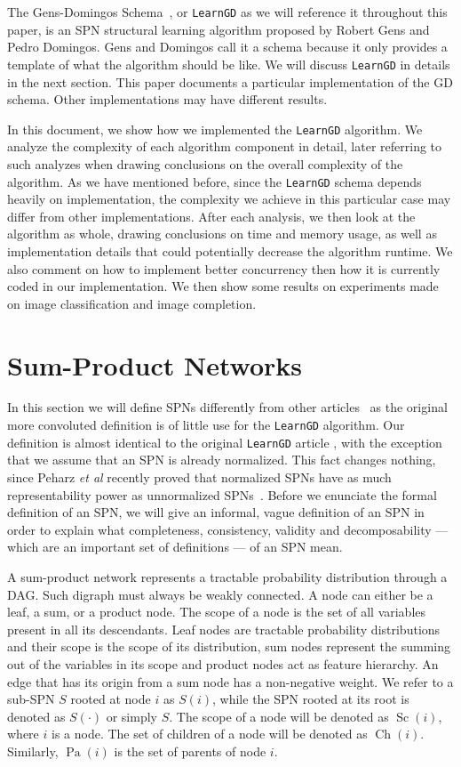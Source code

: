 \documentclass{amsart}
\DeclareMathOperator*{\Ch}{\text{Ch}}
\DeclareMathOperator*{\Pa}{\text{Pa}}
\DeclareMathOperator*{\Sc}{\text{Sc}}
\theoremstyle{plain}
\numberwithin{equation}{section}
\newcommand{\code}[1]{\lstinline[mathescape=true]{#1}}
\begin{document}
The Gens-Domingos Schema~\cite{gens-domingos}, or \code{LearnGD} as we will reference it throughout
this paper, is an SPN structural learning algorithm proposed by Robert Gens and Pedro Domingos.
Gens and Domingos call it a schema because it only provides a template of what the algorithm should
be like. We will discuss \code{LearnGD} in details in the next section. This paper documents a
particular implementation of the GD schema. Other implementations may have different results.

In this document, we show how we implemented the \code{LearnGD} algorithm. We analyze the
complexity of each algorithm component in detail, later referring to such analyzes when drawing
conclusions on the overall complexity of the algorithm. As we have mentioned before, since the
\code{LearnGD} schema depends heavily on implementation, the complexity we achieve in this
particular case may differ from other implementations. After each analysis, we then look at the
algorithm as whole, drawing conclusions on time and memory usage, as well as implementation details
that could potentially decrease the algorithm runtime. We also comment on how to implement better
concurrency then how it is currently coded in our implementation. We then show some results on
experiments made on image classification and image completion.

\section{Sum-Product Networks}

In this section we will define SPNs differently from other articles~\cite{gens-domingos,
poon-domingos, clustering} as the original more convoluted definition is of little use for the
\code{LearnGD} algorithm. Our definition is almost identical to the original \code{LearnGD} article
\cite{gens-domingos}, with the exception that we assume that an SPN is already normalized. This
fact changes nothing, since Peharz \textit{et al} recently proved that normalized SPNs have as much
representability power as unnormalized SPNs~\cite{theoretical-spn}. Before we enunciate the formal
definition of an SPN, we will give an informal, vague definition of an SPN in order to explain what
completeness, consistency, validity and decomposability --- which are an important set of
definitions --- of an SPN mean.

A sum-product network represents a tractable probability distribution through a DAG\@. Such digraph
must always be weakly connected. A node can either be a leaf, a sum, or a product node. The scope
of a node is the set of all variables present in all its descendants. Leaf nodes are tractable
probability distributions and their scope is the scope of its distribution, sum nodes represent the
summing out of the variables in its scope and product nodes act as feature hierarchy. An edge that
has its origin from a sum node has a non-negative weight. We refer to a sub-SPN $S$ rooted at node
$i$ as $S(i)$, while the SPN rooted at its root is denoted as $S(\cdot)$ or simply $S$. The scope
of a node will be denoted as $\Sc(i)$, where $i$ is a node. The set of children of a node will be
denoted as $\Ch(i)$. Similarly, $\Pa(i)$ is the set of parents of node $i$.
\end{document}
